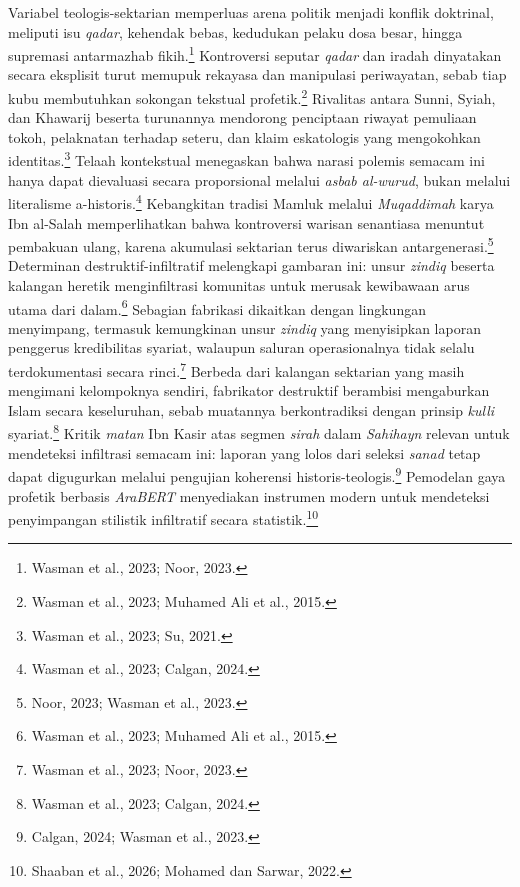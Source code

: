 Variabel teologis-sektarian memperluas arena politik menjadi konflik doktrinal, meliputi isu \textit{qadar}, kehendak bebas, kedudukan pelaku dosa besar, hingga supremasi antarmazhab fikih.\footnote{Wasman et al., 2023; Noor, 2023.} Kontroversi seputar \textit{qadar} dan iradah dinyatakan secara eksplisit turut memupuk rekayasa dan manipulasi periwayatan, sebab tiap kubu membutuhkan sokongan tekstual profetik.\footnote{Wasman et al., 2023; Muhamed Ali et al., 2015.} Rivalitas antara Sunni, Syiah, dan Khawarij beserta turunannya mendorong penciptaan riwayat pemuliaan tokoh, pelaknatan terhadap seteru, dan klaim eskatologis yang mengokohkan identitas.\footnote{Wasman et al., 2023; Su, 2021.} Telaah kontekstual menegaskan bahwa narasi polemis semacam ini hanya dapat dievaluasi secara proporsional melalui \textit{asbab al-wurud}, bukan melalui literalisme a-historis.\footnote{Wasman et al., 2023; Calgan, 2024.} Kebangkitan tradisi Mamluk melalui \textit{Muqaddimah} karya Ibn al-Salah memperlihatkan bahwa kontroversi warisan senantiasa menuntut pembakuan ulang, karena akumulasi sektarian terus diwariskan antargenerasi.\footnote{Noor, 2023; Wasman et al., 2023.} Determinan destruktif-infiltratif melengkapi gambaran ini: unsur \textit{zindiq} beserta kalangan heretik menginfiltrasi komunitas untuk merusak kewibawaan arus utama dari dalam.\footnote{Wasman et al., 2023; Muhamed Ali et al., 2015.} Sebagian fabrikasi dikaitkan dengan lingkungan menyimpang, termasuk kemungkinan unsur \textit{zindiq} yang menyisipkan laporan penggerus kredibilitas syariat, walaupun saluran operasionalnya tidak selalu terdokumentasi secara rinci.\footnote{Wasman et al., 2023; Noor, 2023.} Berbeda dari kalangan sektarian yang masih mengimani kelompoknya sendiri, fabrikator destruktif berambisi mengaburkan Islam secara keseluruhan, sebab muatannya berkontradiksi dengan prinsip \textit{kulli} syariat.\footnote{Wasman et al., 2023; Calgan, 2024.} Kritik \textit{matan} Ibn Kasir atas segmen \textit{sirah} dalam \textit{Sahihayn} relevan untuk mendeteksi infiltrasi semacam ini: laporan yang lolos dari seleksi \textit{sanad} tetap dapat digugurkan melalui pengujian koherensi historis-teologis.\footnote{Calgan, 2024; Wasman et al., 2023.} Pemodelan gaya profetik berbasis \textit{AraBERT} menyediakan instrumen modern untuk mendeteksi penyimpangan stilistik infiltratif secara statistik.\footnote{Shaaban et al., 2026; Mohamed dan Sarwar, 2022.}

